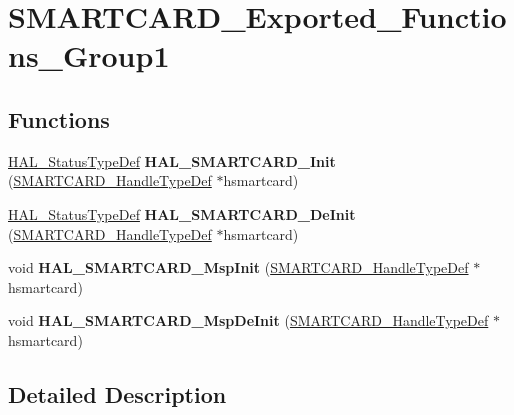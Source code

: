 \hypertarget{group___s_m_a_r_t_c_a_r_d___exported___functions___group1}{}\section{S\+M\+A\+R\+T\+C\+A\+R\+D\+\_\+\+Exported\+\_\+\+Functions\+\_\+\+Group1}
\label{group___s_m_a_r_t_c_a_r_d___exported___functions___group1}
\subsection*{Functions}
\begin{DoxyCompactItemize}
\item 
\mbox{\label{group___s_m_a_r_t_c_a_r_d___exported___functions___group1_ga4204e323a0e5aba878d3b5e823faa2c7}} 
\hyperlink{stm32f0xx__hal__def_8h_a63c0679d1cb8b8c684fbb0632743478f}{H\+A\+L\+\_\+\+Status\+Type\+Def} {\bfseries H\+A\+L\+\_\+\+S\+M\+A\+R\+T\+C\+A\+R\+D\+\_\+\+Init} (\hyperlink{struct_s_m_a_r_t_c_a_r_d___handle_type_def}{S\+M\+A\+R\+T\+C\+A\+R\+D\+\_\+\+Handle\+Type\+Def} $\ast$hsmartcard)
\item 
\mbox{\label{group___s_m_a_r_t_c_a_r_d___exported___functions___group1_gac9096bdcef0f25f02e9e8cd1a7f25fae}} 
\hyperlink{stm32f0xx__hal__def_8h_a63c0679d1cb8b8c684fbb0632743478f}{H\+A\+L\+\_\+\+Status\+Type\+Def} {\bfseries H\+A\+L\+\_\+\+S\+M\+A\+R\+T\+C\+A\+R\+D\+\_\+\+De\+Init} (\hyperlink{struct_s_m_a_r_t_c_a_r_d___handle_type_def}{S\+M\+A\+R\+T\+C\+A\+R\+D\+\_\+\+Handle\+Type\+Def} $\ast$hsmartcard)
\item 
\mbox{\label{group___s_m_a_r_t_c_a_r_d___exported___functions___group1_ga11318995bc017548fc1bb9785a645bf6}} 
void {\bfseries H\+A\+L\+\_\+\+S\+M\+A\+R\+T\+C\+A\+R\+D\+\_\+\+Msp\+Init} (\hyperlink{struct_s_m_a_r_t_c_a_r_d___handle_type_def}{S\+M\+A\+R\+T\+C\+A\+R\+D\+\_\+\+Handle\+Type\+Def} $\ast$hsmartcard)
\item 
\mbox{\label{group___s_m_a_r_t_c_a_r_d___exported___functions___group1_ga4f1597d36b58b1235b97b781dedb6189}} 
void {\bfseries H\+A\+L\+\_\+\+S\+M\+A\+R\+T\+C\+A\+R\+D\+\_\+\+Msp\+De\+Init} (\hyperlink{struct_s_m_a_r_t_c_a_r_d___handle_type_def}{S\+M\+A\+R\+T\+C\+A\+R\+D\+\_\+\+Handle\+Type\+Def} $\ast$hsmartcard)
\end{DoxyCompactItemize}


\subsection{Detailed Description}
